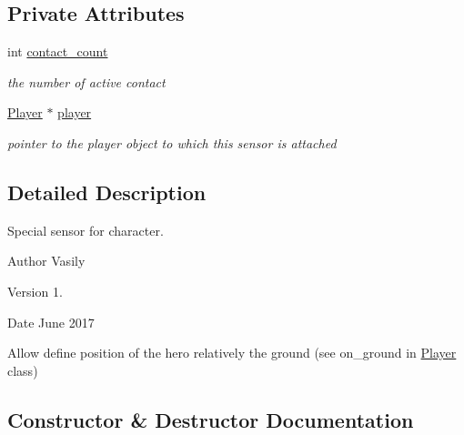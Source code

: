 \subsection*{Private Attributes}
\begin{DoxyCompactItemize}
\item 
\mbox{\label{class_player_sensor_afd6fd57380fc1752edbd601566e52980}} 
int \hyperlink{class_player_sensor_afd6fd57380fc1752edbd601566e52980}{contact\+\_\+count}
\begin{DoxyCompactList}\small\item\em the number of active contact \end{DoxyCompactList}\item 
\mbox{\label{class_player_sensor_a28ca9f490022e0473064290956fe6852}} 
\hyperlink{class_player}{Player} $\ast$ \hyperlink{class_player_sensor_a28ca9f490022e0473064290956fe6852}{player}
\begin{DoxyCompactList}\small\item\em pointer to the player object to which this sensor is attached \end{DoxyCompactList}\end{DoxyCompactItemize}


\subsection{Detailed Description}
Special sensor for character. 

\begin{DoxyAuthor}{Author}
Vasily 
\end{DoxyAuthor}
\begin{DoxyVersion}{Version}
1. 
\end{DoxyVersion}
\begin{DoxyDate}{Date}
June 2017
\end{DoxyDate}
Allow define position of the hero relatively the ground (see on\+\_\+ground in \hyperlink{class_player}{Player} class) 

\subsection{Constructor \& Destructor Documentation}
\mbox{\label{class_player_sensor_a1e74f6ad656f4cdc6449fc55b41dff42}} 
